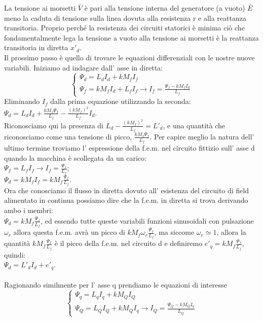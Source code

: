 \documentclass[Lau,noexaminfo]{sapthesis}
\begin{document}
	La tensione ai morsetti $\bar{V}$ è pari alla tensione interna del generatore (a vuoto) $\bar{E}$ meno la caduta di tensione sulla linea dovuta alla resistenza r e alla reattanza transitoria. Proprio perché la resistenza dei circuiti statorici è minima ciò che fondamentalmente lega la tensione a vuoto alla tensione ai morsetti è la reattanza transitoria in diretta $x'_d$.\\
	Il prossimo passo è quello di trovare le equazioni differenziali con le nostre nuove variabili. Iniziamo ad indagare dall' asse in diretta:\\
	\[
	\begin{cases}
	\Psi_d=L_dI_d+kM_fI_f\\
	\Psi_f=kM_fI_d+L_fI_f \rightarrow I_f=\frac{\Psi_f-kM_fI_d}{L_f}
	\end{cases}
	\]
	Eliminando $I_f$ dalla prima equazione utilizzando la seconda:\\
	$\Psi_d=L_dI_d+\frac{kM_f\Psi_f}{L_f}-\frac{(kM_f)^2}{L_f}I_d$.\\
	Riconosciamo qui la presenza di $L_d-\frac{(kM_f)^2}{L_f}=L'_d$, e una quantità che riconosciamo come una tensione di picco, $\frac{kM_f\Psi_f}{L_f}$. Per capire meglio la natura dell' ultimo termine troviamo l' espressione della f.e.m. nel circuito fittizio sull' asse d quando la macchina è scollegata da un carico:\\
	$\Psi_f=L_fI_f \rightarrow I_f=\frac{\Psi_f}{L_f}$;\\
	$\Psi_d=kM_fI_f=kM_f\frac{\Psi_f}{L_f}$.\\Ora che conosciamo il flusso in diretta dovuto all' esistenza del circuito di field alimentato in continua possiamo dire che la f.e.m. in diretta si trova derivando ambo i membri:\\
	$\dot{\Psi}_d=kM_f\frac{\dot{\Psi}_f}{L_f}$, ed essendo tutte queste variabili funzioni sinusoidali con pulsazione $\omega_r$ allora questa f.e.m. avrà un picco di $kM_f\omega_r\frac{\Psi_f}{L_f}$, ma siccome $\omega_r\simeq1$, allora la quantità $kM_f\frac{\Psi_f}{L_f}$ è il picco della f.e.m. nel circuito d e definiremo $e'_q=kM_f\frac{\Psi_f}{L_f}$, quindi:\\
	$\Psi_d=L'_dI_d+e'_q$.\\\\
	Ragionando similmente per l' asse q prendiamo le equazioni di interesse\\
	\[
	\begin{cases}
	\Psi_q=L_qI_q+kM_QI_Q\\
	\Psi_Q=L_QI_Q+kM_QI_q \rightarrow I_Q=\frac{\Psi_Q-kM_QI_q}{L_Q}
	\end{cases}
	\]
\end{document}
